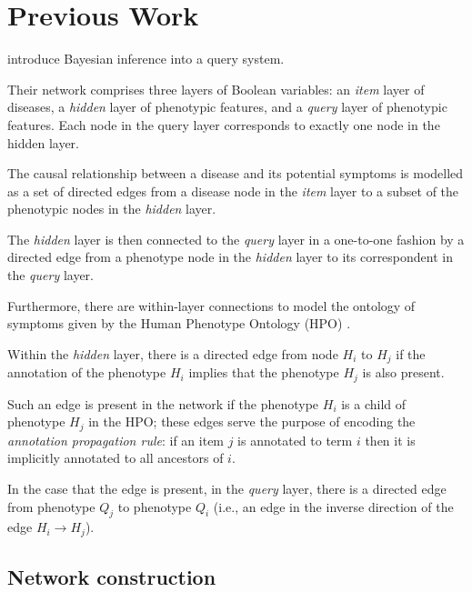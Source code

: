 \section{Previous Work}
\label{sec:lit-rev}

\cite{bauer2012bayesian} introduce Bayesian inference into a query system.

Their network comprises three layers of Boolean variables: an {\it item} layer
of diseases, a {\it hidden} layer of phenotypic features, and a {\it query}
layer of phenotypic features.
%
Each node in the query layer corresponds to exactly one node in the hidden
layer.

The causal relationship between a disease and its potential symptoms is modelled
as a set of directed edges from a disease node in the {\it item} layer to a
subset of the phenotypic nodes in the {\it hidden} layer.

The {\it hidden} layer is then connected to the {\it query} layer in a
one-to-one fashion by a directed edge from a phenotype node in the {\it hidden}
layer to its correspondent in the {\it query} layer.

Furthermore, there are within-layer connections to model the ontology of
symptoms given by the Human Phenotype Ontology (HPO) \cite{kohler2014hpo}.

Within the {\it hidden} layer, there is a directed edge from node $H_i$ to $H_j$
if the annotation of the phenotype $H_i$ implies that the phenotype $H_j$ is
also present.

Such an edge is present in the network if the phenotype $H_i$ is a child of
phenotype $H_j$ in the HPO; these edges serve the purpose of encoding the {\it
annotation propagation rule}: if an item $j$ is annotated to term $i$ then it is
implicitly annotated to all ancestors of $i$.

In the case that the edge is present, in the {\it query} layer, there is a
directed edge from phenotype $Q_j$ to phenotype $Q_i$ (i.e., an edge in the
inverse direction of the edge $H_i \to H_j$).

%

\subsection{Network construction}


